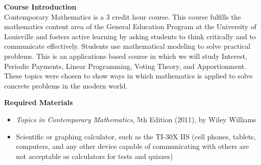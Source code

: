 \documentclass[addpoints,12pt]{exam}
\begin{document}
\sffamily
\def\wl{\par \vspace{\baselineskip}}
\pagestyle{headandfoot}

\runningheadrule
{}
\runningheader{}{}{}
\noindent {} 

\wl
\noindent
\textbf{Course Introduction} \\
Contemporary Mathematics is a 3 credit hour course. This course fulfills the mathematics content area of the General Education Program at the University of Louisville and fosters active learning by asking students to think critically and to communicate effectively. Students use mathematical modeling to solve practical problems. This is an applications based course in which we will study Interest, Periodic Payments, Linear Programming, Voting Theory, and Apportionment. These topics were chosen to show ways in which mathematics is applied to solve concrete problems in the modern world. 
\wl
\noindent
\textbf{Required Materials} 
\begin{itemize} \itemsep10pt \parskip-6pt 
\item \textit{Topics in Contemporary Mathematics}, 5th Edition (2011), by Wiley Williams
\item Scientific or graphing calculator, such as the TI-30X IIS (cell phones, tablets, computers, and any other device capable of communicating with others are not acceptable as calculators for tests and quizzes)
\end{itemize} 
\end{document}
